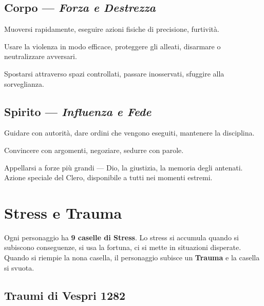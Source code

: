 \subsection{Corpo — \textit{Forza e Destrezza}}

\begin{description}[leftmargin=2em, style=nextline]
  \item[\cinzel Agire] Muoversi rapidamente, eseguire azioni fisiche
    di precisione, furtività.
  \item[\cinzel Combattere] Usare la violenza in modo efficace, proteggere
    gli alleati, disarmare o neutralizzare avversari.
  \item[\cinzel Manovrare] Spostarsi attraverso spazi controllati,
    passare inosservati, sfuggire alla sorveglianza.
\end{description}

\subsection{Spirito — \textit{Influenza e Fede}}

\begin{description}[leftmargin=2em, style=nextline]
  \item[\cinzel Comandare] Guidare con autorità, dare ordini che vengono
    eseguiti, mantenere la disciplina.
  \item[\cinzel Persuadere] Convincere con argomenti, negoziare, sedurre con parole.
  \item[\cinzel Invocare] Appellarsi a forze più grandi — Dio, la giustizia,
    la memoria degli antenati. Azione speciale del Clero, disponibile
    a tutti nei momenti estremi.
\end{description}

\secsep

\section{Stress e Trauma}

Ogni personaggio ha \textbf{9 caselle di Stress}. Lo stress si accumula
quando si subiscono conseguenze, si usa la fortuna, ci si mette in
situazioni disperate. Quando si riempie la nona casella, il personaggio
subisce un \textbf{Trauma} e la casella si svuota.

\subsection{Traumi di Vespri 1282}

